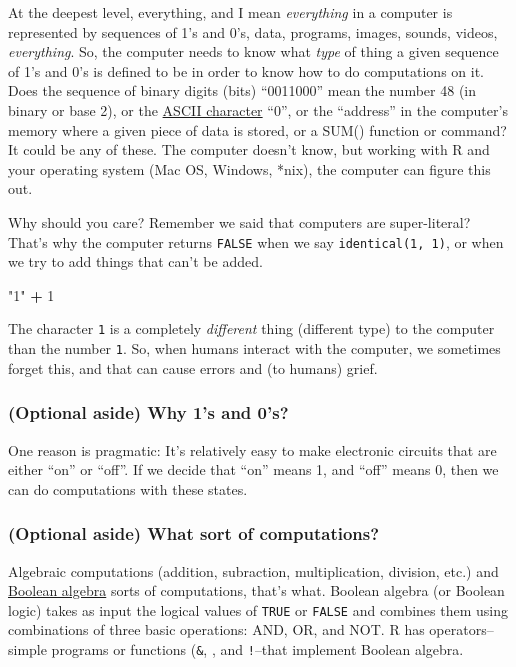 \documentclass[]{article}
\newenvironment{Shaded}{\begin{snugshade}}{\end{snugshade}}
\newcommand{\DecValTok}[1]{\textcolor[rgb]{0.00,0.00,0.81}{#1}}
\newcommand{\StringTok}[1]{\textcolor[rgb]{0.31,0.60,0.02}{#1}}
\newcommand{\OperatorTok}[1]{\textcolor[rgb]{0.81,0.36,0.00}{\textbf{#1}}}
\begin{document}
At the deepest level, everything, and I mean \emph{everything} in a
computer is represented by sequences of 1's and 0's, data, programs,
images, sounds, videos, \emph{everything}. So, the computer needs to
know what \emph{type} of thing a given sequence of 1's and 0's is
defined to be in order to know how to do computations on it. Does the
sequence of binary digits (bits) ``0011000'' mean the number 48 (in
binary or base 2), or the
\href{https://en.wikipedia.org/wiki/ASCII}{ASCII character} ``0'', or
the ``address'' in the computer's memory where a given piece of data is
stored, or a SUM() function or command? It could be any of these. The
computer doesn't know, but working with R and your operating system (Mac
OS, Windows, *nix), the computer can figure this out.

Why should you care? Remember we said that computers are super-literal?
That's why the computer returns \texttt{FALSE} when we say
\texttt{identical(\textquotesingle{}1\textquotesingle{},\ 1)}, or when
we try to add things that can't be added.

\begin{Shaded}
\begin{Highlighting}[]
\StringTok{"1"} \OperatorTok{+}\StringTok{ }\DecValTok{1}
\end{Highlighting}
\end{Shaded}

The character \texttt{\textquotesingle{}1\textquotesingle{}} is a
completely \emph{different} thing (different type) to the computer than
the number \texttt{1}. So, when humans interact with the computer, we
sometimes forget this, and that can cause errors and (to humans) grief.

\subsubsection{(Optional aside) Why 1's and
0's?}\label{optional-aside-why-1s-and-0s}

One reason is pragmatic: It's relatively easy to make electronic
circuits that are either ``on'' or ``off''. If we decide that ``on''
means 1, and ``off'' means 0, then we can do computations with these
states.

\subsubsection{(Optional aside) What sort of
computations?}\label{optional-aside-what-sort-of-computations}

Algebraic computations (addition, subraction, multiplication, division,
etc.) and \href{https://en.wikipedia.org/wiki/Boolean_algebra}{Boolean
algebra} sorts of computations, that's what. Boolean algebra (or Boolean
logic) takes as input the logical values of \texttt{TRUE} or
\texttt{FALSE} and combines them using combinations of three basic
operations: AND, OR, and NOT. R has operators--simple programs or
functions (\texttt{\&}, \texttt{\textbar{}}, and \texttt{!}--that
implement Boolean algebra.
\end{document}

